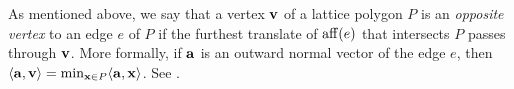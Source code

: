 







As mentioned above, we say that a vertex $\mathbf{v}$ of a lattice polygon $P$ is an \emph{opposite vertex} to an edge $e$ of $P$ if the furthest translate of $\operatorname{aff}(e)$ that intersects $P$ passes through $\mathbf{v}$. More formally, if $\mathbf{a}$ is an outward normal vector of the edge $e$, then $\langle \mathbf{a}, \mathbf{v} \rangle = \min_{\mathbf{x} \in P} \langle \mathbf{a},\mathbf{x} \rangle$. See .


